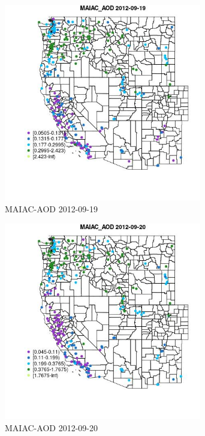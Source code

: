 \begin{figure} 
\centering  
\includegraphics[width=0.77\textwidth]{Code_Outputs/ML_input_report_ML_input_PM25_Step5_part_d_de_duplicated_aves_ML_input_MapObsMAIAC_AOD2012-09-19.jpg} 
\caption{\label{fig:ML_input_report_ML_input_PM25_Step5_part_d_de_duplicated_aves_ML_inputMapObsMAIAC_AOD2012-09-19}MAIAC-AOD 2012-09-19} 
\end{figure} 
 

\begin{figure} 
\centering  
\includegraphics[width=0.77\textwidth]{Code_Outputs/ML_input_report_ML_input_PM25_Step5_part_d_de_duplicated_aves_ML_input_MapObsMAIAC_AOD2012-09-20.jpg} 
\caption{\label{fig:ML_input_report_ML_input_PM25_Step5_part_d_de_duplicated_aves_ML_inputMapObsMAIAC_AOD2012-09-20}MAIAC-AOD 2012-09-20} 
\end{figure} 
 


